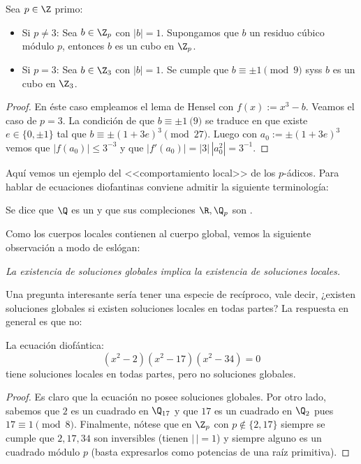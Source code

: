 \documentclass[teoria-numeros.tex]{subfiles}
\begin{document}
\begin{prop}
	Sea $p \in \Z$ primo:
	\begin{itemize}
		\item Si $p \ne 3$:
			Sea $b \in \Z_p$ con $|b| = 1$.
			Supongamos que $b$ un residuo cúbico módulo $p$, entonces $b$ es un cubo en $\Z_p$.
		\item Si $p = 3$:
			Sea $b \in \Z_3$ con $|b| = 1$.
			Se cumple que $b \equiv \pm 1 \pmod 9$ syss $b$ es un cubo en $\Z_3$.
	\end{itemize}
\end{prop}
\begin{proof}
	En éste caso empleamos el lema de Hensel con $f(x) := x^3 - b$.
	Veamos el caso de $p = 3$. La condición de que $b \equiv \pm 1 \pod 9$ se traduce en que existe $e \in \{ 0, \pm 1 \}$
	tal que $b \equiv \pm (1 + 3e)^3 \pmod{27}$.
	Luego con $a_0 := \pm(1 + 3e)^3$ vemos que $|f(a_0)| \le 3^{-3}$ y que $|f'(a_0)| = |3| \, |a_0^2| = 3^{-1}$.
\end{proof}

Aquí vemos un ejemplo del <<comportamiento local>> de los $p$-ádicos.
Para hablar de ecuaciones diofantinas conviene admitir la siguiente terminología:
\begin{mydef}
	Se dice que $\Q$ es un  y que sus compleciones $\R, \Q_p$ son .
\end{mydef}
Como los cuerpos locales contienen al cuerpo global, vemos la siguiente observación a modo de eslógan:
\begin{displayquote}
	\itshape
	La existencia de soluciones globales implica la existencia de soluciones locales.
\end{displayquote}
Una pregunta interesante sería tener una especie de recíproco, vale decir, ¿existen soluciones globales si existen soluciones locales en todas partes?
La respuesta en general es que no:

\begin{prob}
	La ecuación diofántica:
	$$ (x^2 - 2)(x^2 - 17)(x^2 - 34) = 0 $$
	tiene soluciones locales en todas partes, pero no soluciones globales.
\end{prob}
\begin{proof}
	Es claro que la ecuación no posee soluciones globales.
	Por otro lado, sabemos que $2$ es un cuadrado en $\Q_{17}$ y que $17$ es un cuadrado en $\Q_2$ pues $17 \equiv 1 \pmod 8$.
	Finalmente, nótese que en $\Z_p$ con $p \notin \{ 2, 17 \}$ siempre se cumple que $2, 17, 34$ son inversibles (tienen $|\,| = 1$)
	y siempre alguno es un cuadrado módulo $p$ (basta expresarlos como potencias de una raíz primitiva).
\end{proof}
\end{document}
